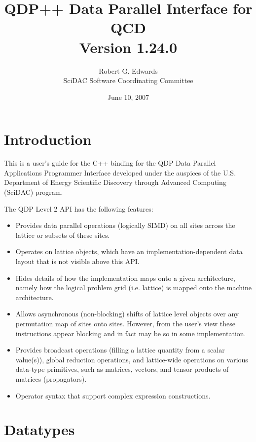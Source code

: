\documentclass[12pt,letterpaper]{article}
\newcommand{\cpp}{C++}
\begin{document}
\title{
   QDP++ Data Parallel Interface for QCD  \\{\large Version 1.24.0}
}
\author{Robert G. Edwards\\
SciDAC Software Coordinating Committee}

\date{June 10, 2007}

\maketitle
\section{Introduction}
This is a user's guide for the \cpp{} binding for the QDP Data Parallel
Applications Programmer Interface developed under the auspices of the
U.S. Department of Energy Scientific Discovery through Advanced
Computing (SciDAC) program.

The QDP Level 2 API has the following features:
\begin{itemize}
\item Provides data parallel operations (logically SIMD) on all sites
across the lattice or subsets of these sites.
\item Operates on lattice objects, which have an
implementation-dependent data layout that is not visible above this
API.
\item Hides details of how the implementation maps onto a given
architecture, namely how the logical problem grid (i.e. lattice) is
mapped onto the machine architecture.
\item Allows asynchronous (non-blocking) shifts of lattice level
objects over any permutation map of sites onto sites. However, from
the user's view these instructions appear blocking and in fact may be
so in some implementation.
\item Provides broadcast operations (filling a lattice quantity from a
scalar value(s)), global reduction operations, and lattice-wide
operations on various data-type primitives, such as matrices, vectors,
and tensor products of matrices (propagators).
\item
Operator syntax that support complex expression constructions.
\end{itemize}

\section{Datatypes}
\label{sec.datatypes}
\end{document}
